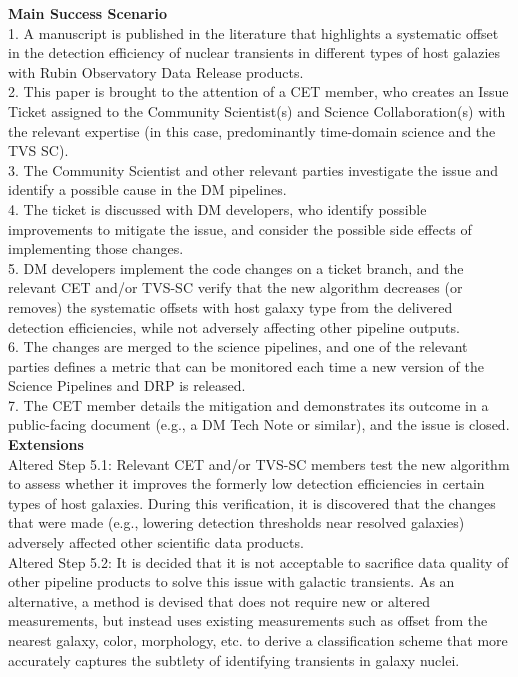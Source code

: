 {\bf Main Success Scenario} \\
1. A manuscript is published in the literature that highlights a systematic offset in the detection efficiency of nuclear transients in different types of host galazies with Rubin Observatory Data Release products. \\
2. This paper is brought to the attention of a CET member, who creates an Issue Ticket assigned to the Community Scientist(s) and Science Collaboration(s) with the relevant expertise (in this case, predominantly time-domain science and the TVS SC). \\
3. The Community Scientist and other relevant parties investigate the issue and identify a possible cause in the DM pipelines. \\
4. The ticket is discussed with DM developers, who identify possible improvements to mitigate the issue, and consider the possible side effects of implementing those changes. \\
5. DM developers implement the code changes on a ticket branch, and the relevant CET and/or TVS-SC verify that the new algorithm decreases (or removes) the systematic offsets with host galaxy type from the delivered detection efficiencies, while not adversely affecting other pipeline outputs. \\
6. The changes are merged to the science pipelines, and one of the relevant parties defines a metric that can be monitored each time a new version of the Science Pipelines and DRP is released. \\
7.  The CET member details the mitigation and demonstrates its outcome in a public-facing document (e.g., a DM Tech Note or similar), and the issue is closed. \\

{\bf Extensions} \\
Altered Step 5.1: Relevant CET and/or TVS-SC members test the new algorithm to assess whether it improves the formerly low detection efficiencies in certain types of host galaxies.  During this verification, it is discovered that the changes that were made (e.g., lowering detection thresholds near resolved galaxies) adversely affected other scientific data products. \\
Altered Step 5.2: It is decided that it is not acceptable to sacrifice data quality of other pipeline products to solve this issue with galactic transients.  As an alternative, a method is devised that does not require new or altered measurements, but instead uses existing measurements such as offset from the nearest galaxy, color, morphology, etc. to derive a classification scheme that more accurately captures the subtlety of identifying transients in galaxy nuclei. \\

